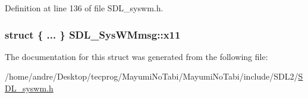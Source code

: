 Definition at line 136 of file S\-D\-L\-\_\-syswm.\-h.

\hypertarget{struct_s_d_l___sys_w_mmsg_ac60fef6de87deff6fe9cf4f49f9ff96c}{
\subsubsection[{x11}]{\setlength{\rightskip}{0pt plus 5cm}struct \{ ... \}   S\-D\-L\-\_\-\-Sys\-W\-Mmsg\-::x11}}\label{struct_s_d_l___sys_w_mmsg_ac60fef6de87deff6fe9cf4f49f9ff96c}


The documentation for this struct was generated from the following file\-:\begin{DoxyCompactItemize}
\item 
/home/andre/\-Desktop/tecprog/\-Mayumi\-No\-Tabi/\-Mayumi\-No\-Tabi/include/\-S\-D\-L2/\hyperlink{_s_d_l__syswm_8h}{S\-D\-L\-\_\-syswm.\-h}\end{DoxyCompactItemize}
